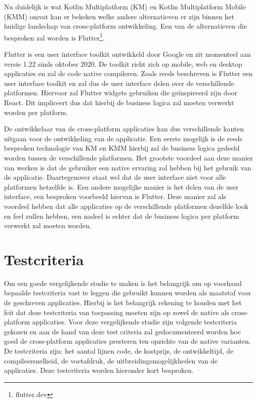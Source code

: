 Nu duidelijk is wat Kotlin Multiplatform (KM) en Kotlin Multiplatform Mobile (KMM) omvat kan er bekeken welke andere alternatieven er zijn binnen het huidige landschap van cross-platform ontwikkeling. Een van de alternatieven die besproken zal worden is Flutter\footnote{flutter.dev}.

Flutter is een user interface toolkit ontwikkeld door Google en zit momenteel aan versie 1.22 sinds oktober 2020.\autocite{Sells2020} De toolkit richt zich op mobile, web en desktop applicaties en zal de code native compileren. Zoals reeds beschreven is Flutter een user interface toolkit en zal dus de user interface delen over de verschillende platformen. Hiervoor zal Flutter widgets gebruiken die geïnspireerd zijn door React.\autocite{FlutterWidgets} Dit impliceert dus dat hierbij de business logica zal moeten verwerkt worden per platform.

De ontwikkelaar van de cross-platform applicaties kan dus verschillende kanten uitgaan voor de ontwikkeling van de applicatie. Een eerste mogelijk is de reeds besproken technologie van KM en KMM hierbij zal de business logica gedeeld worden tussen de verschillende platformen. Het grootste voordeel aan deze manier van werken is dat de gebruiker een native ervaring zal hebben bij het gebruik van de applicatie. Daartegenover staat wel dat de user interface niet voor alle platformen hetzelfde is. Een andere mogelijke manier is het delen van de user interface, een besproken voorbeeld hiervan is Flutter. Deze manier zal als voordeel hebben dat alle applicaties op de verschillende platformen dezelfde look en feel zullen hebben, een nadeel is echter dat de business logica per platform verwerkt zal moeten worden.


\section{Testcriteria}
\label{sec:SVZtestcriteria}


Om een goede vergelijkende studie te maken is het belangrijk om op voorhand bepaalde testcriteria vast te leggen die gebruikt kunnen worden als maatstaf voor de geschreven applicaties. Hierbij is het belangrijk rekening te houden met het feit dat deze testcriteria van toepassing moeten zijn op zowel de native als cross-platform applicaties. Voor deze vergelijkende studie zijn volgende testcriteria gekozen en aan de hand van deze test criteria zal gedocumenteerd worden hoe goed de cross-platform applicaties presteren ten opzichte van de native varianten. De testcriteria zijn: het aantal lijnen code, de kostprijs, de ontwikkeltijd, de compileersnelheid, de voetafdruk, de uitbreidingsmogelijkheden van de applicaties. Deze testcriteria worden hieronder kort besproken. 


